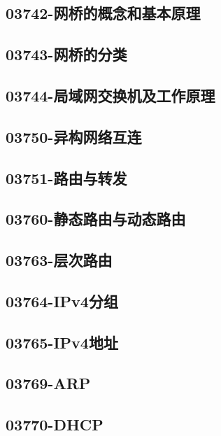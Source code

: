 \subsection{03742-网桥的概念和基本原理}

\subsection{03743-网桥的分类}

\subsection{03744-局域网交换机及工作原理}

\subsection{03750-异构网络互连}

\subsection{03751-路由与转发}

\subsection{03760-静态路由与动态路由}

\subsection{03763-层次路由}

\subsection{03764-IPv4分组}

\subsection{03765-IPv4地址}

\subsection{03769-ARP}

\subsection{03770-DHCP}

